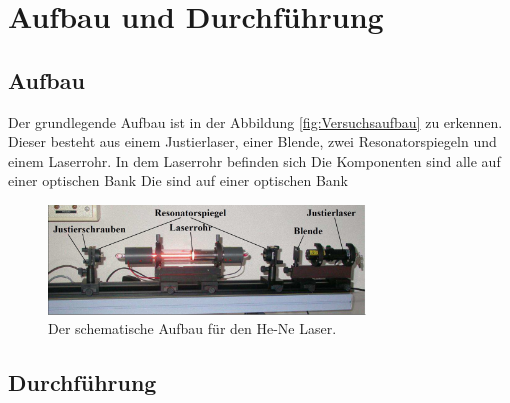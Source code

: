 \section{Aufbau und Durchführung}
\label{sec:AufbauUndDurchführung}
\subsection{Aufbau}
\label{sec:Aufbau}
Der grundlegende Aufbau ist in der Abbildung \autoref{fig:Versuchsaufbau} zu erkennen.
Dieser besteht aus einem Justierlaser, einer Blende, zwei Resonatorspiegeln und einem Laserrohr. In dem Laserrohr befinden sich 
Die Komponenten sind alle auf einer optischen Bank
Die  sind auf einer optischen Bank 
\begin{figure}
    \centering
    \includegraphics[width=0.75\textwidth]{Bilder/Aufbau.png}
    \caption{Der schematische Aufbau für den He-Ne Laser. \cite{anleitungV61}}
    \label{fig:Versuchsaufbau}
  \end{figure}

\subsection{Durchführung}
\label{sec:Durchführung}